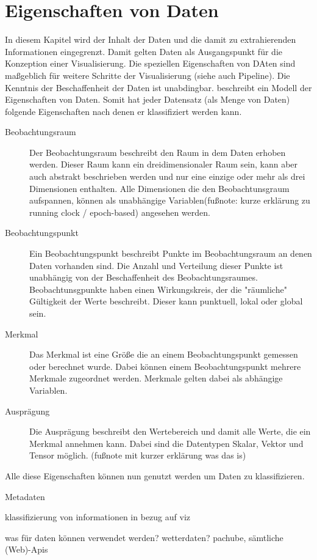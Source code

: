 \documentclass[a4paper, 12pt, DIVcalc, onepage, pdftex, headsepline, footsepline]{scrreprt}
\begin{document}
\section{Eigenschaften von Daten}
\label{sec:EigenschaftenDaten}
In diesem Kapitel wird der Inhalt der Daten und die damit zu extrahierenden Informationen eingegrenzt.
Damit gelten Daten als Ausgangspunkt für die Konzeption einer Visualisierung. Die speziellen
Eigenschaften von DAten sind maßgeblich für weitere Schritte der Visualisierung (siehe auch Pipeline).
Die Kenntnis der Beschaffenheit der Daten ist unabdingbar.
\cite{Schumann} beschreibt ein Modell der Eigenschaften von Daten. Somit hat jeder Datensatz (als Menge von
Daten) folgende Eigenschaften nach denen er klassifiziert werden kann.
\begin{description}
\item[Beobachtungsraum]
Der Beobachtungsraum beschreibt den Raum in dem Daten erhoben werden. Dieser Raum kann ein
dreidimensionaler Raum sein, kann aber auch abstrakt beschrieben werden und nur eine einzige oder
mehr als drei Dimensionen enthalten. Alle Dimensionen die den Beobachtunsgraum aufspannen,
können als unabhängige Variablen(fußnote: kurze erklärung zu running clock / epoch-based) angesehen werden.
\item[Beobachtungspunkt]
Ein Beobachtungspunkt beschreibt Punkte im Beobachtungsraum an denen Daten vorhanden sind. Die Anzahl und Verteilung
dieser Punkte ist unabhängig von der Beschaffenheit des Beobachtungsraumes. Beobachtunsgpunkte haben einen
Wirkungskreis, der die "räumliche" Gültigkeit der Werte beschreibt. Dieser kann punktuell, lokal oder global sein.
\item[Merkmal]
Das Merkmal ist eine Größe die an einem Beobachtungspunkt gemessen oder berechnet wurde. Dabei können
einem Beobachtungspunkt mehrere Merkmale zugeordnet werden. Merkmale gelten dabei als abhängige Variablen.
\item[Ausprägung]
Die Ausprägung beschreibt den Wertebereich und damit alle Werte, die ein Merkmal annehmen kann.
Dabei sind die Datentypen Skalar, Vektor und Tensor möglich. (fußnote mit kurzer erklärung was das is)
\end{description}
Alle diese Eigenschaften können nun genutzt werden um Daten zu klassifizieren.


Metadaten

klassifizierung von informationen in bezug auf viz

was für daten können verwendet werden? wetterdaten? pachube, sämtliche (Web)-Apis
\end{document}
